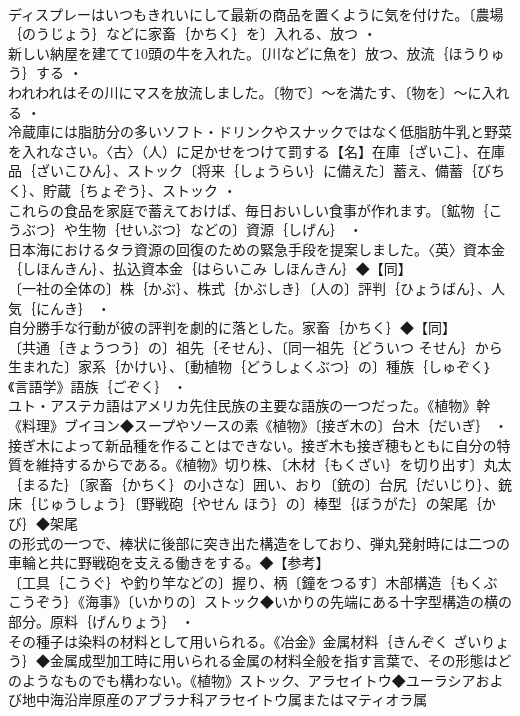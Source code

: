 \documentclass[8pt]{extreport}
\begin{document}
\begin{CJK}{UTF8}{min}
\\	ディスプレーはいつもきれいにして最新の商品を置くように気を付けた。〔農場｛のうじょう｝などに家畜｛かちく｝を〕入れる、放つ ・
\\	新しい納屋を建てて10頭の牛を入れた。〔川などに魚を〕放つ、放流｛ほうりゅう｝する ・
\\	われわれはその川にマスを放流しました。〔物で〕～を満たす、〔物を〕～に入れる ・
\\	冷蔵庫には脂肪分の多いソフト・ドリンクやスナックではなく低脂肪牛乳と野菜を入れなさい。〈古〉（人）に足かせをつけて罰する【名】在庫｛ざいこ｝、在庫品｛ざいこひん｝、ストック〔将来｛しょうらい｝に備えた〕蓄え、備蓄｛びちく｝、貯蔵｛ちょぞう｝、ストック ・
\\	これらの食品を家庭で蓄えておけば、毎日おいしい食事が作れます。〔鉱物｛こうぶつ｝や生物｛せいぶつ｝などの〕資源｛しげん｝ ・
\\	日本海におけるタラ資源の回復のための緊急手段を提案しました。〈英〉資本金｛しほんきん｝、払込資本金｛はらいこみ しほんきん｝◆【同】
\\	〔一社の全体の〕株｛かぶ｝、株式｛かぶしき｝〔人の〕評判｛ひょうばん｝、人気｛にんき｝ ・
\\	自分勝手な行動が彼の評判を劇的に落とした。家畜｛かちく｝◆【同】
\\	〔共通｛きょうつう｝の〕祖先｛そせん｝、〔同一祖先｛どういつ そせん｝から生まれた〕家系｛かけい｝、〔動植物｛どうしょくぶつ｝の〕種族｛しゅぞく｝《言語学》語族｛ごぞく｝ ・
\\	ユト・アステカ語はアメリカ先住民族の主要な語族の一つだった。《植物》幹《料理》ブイヨン◆スープやソースの素《植物》〔接ぎ木の〕台木｛だいぎ｝ ・
\\	接ぎ木によって新品種を作ることはできない。接ぎ木も接ぎ穂もともに自分の特質を維持するからである。《植物》切り株、〔木材｛もくざい｝を切り出す〕丸太｛まるた｝〔家畜｛かちく｝の小さな〕囲い、おり〔銃の〕台尻｛だいじり｝、銃床｛じゅうしょう｝〔野戦砲｛やせん ほう｝の〕棒型｛ぼうがた｝の架尾｛かび｝◆架尾
\\	の形式の一つで、棒状に後部に突き出た構造をしており、弾丸発射時には二つの車輪と共に野戦砲を支える働きをする。◆【参考】
\\	〔工具｛こうぐ｝や釣り竿などの〕握り、柄〔鐘をつるす〕木部構造｛もくぶ こうぞう｝《海事》〔いかりの〕ストック◆いかりの先端にある十字型構造の横の部分。原料｛げんりょう｝ ・
\\	その種子は染料の材料として用いられる。《冶金》金属材料｛きんぞく ざいりょう｝◆金属成型加工時に用いられる金属の材料全般を指す言葉で、その形態はどのようなものでも構わない。《植物》ストック、アラセイトウ◆ユーラシアおよび地中海沿岸原産のアブラナ科アラセイトウ属またはマティオラ属

\end{CJK}
\end{document}

